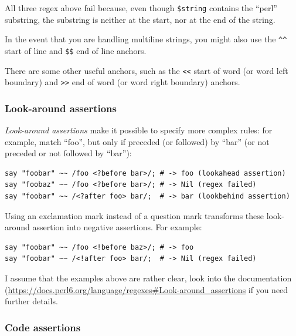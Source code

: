 All three regex above fail because, even though 
\verb'$string' contains the ``perl'' substring, the 
substring is neither at the start, nor at the end of 
the string.

In the event that you are handling multiline strings, you might 
also use the \verb'^^' start of line and \verb'$$' end of line anchors.

There are some other useful anchors, such as the \verb'<<' 
start of word (or word left boundary) and \verb'>>' end 
of word (or word right boundary) anchors.

\subsubsection{Look-around assertions}


\emph{Look-around assertions} make it possible to 
specify more complex rules: for example, match ``foo'', 
but only if preceded (or followed) by ``bar'' (or not 
preceded or not followed by ``bar''):

\begin{verbatim}
say "foobar" ~~ /foo <?before bar>/; # -> foo (lookahead assertion)
say "foobaz" ~~ /foo <?before bar>/; # -> Nil (regex failed)
say "foobar" ~~ /<?after foo> bar/;  # -> bar (lookbehind assertion)
\end{verbatim}
%
Using an exclamation mark instead of a question mark transforms 
these look-around assertion into negative assertions. For example:

\begin{verbatim}
say "foobar" ~~ /foo <!before baz>/; # -> foo 
say "foobar" ~~ /<!after foo> bar/;  # -> Nil (regex failed)
\end{verbatim}
%
I assume that the examples above are rather clear, look into the 
documentation 
(\url{https://docs.perl6.org/language/regexes#Look-around_assertions} 
if you need further details. 

\subsubsection{Code assertions}


